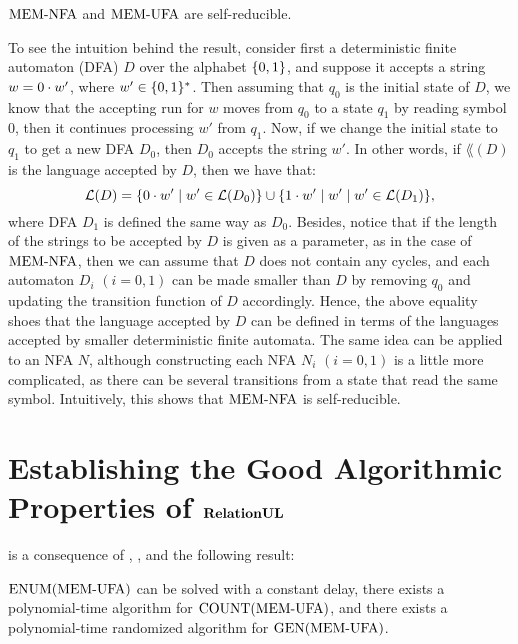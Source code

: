 \documentclass[11pt,twoside=off,numbers=noenddot]{scrbook}
\begin{document}
\begin{proposition}
    $\text{MEM-NFA}$ and $\text{MEM-UFA}$ are self-reducible.
\end{proposition}

\begin{proofidea}
    To see the intuition behind the result, consider first a deterministic finite automaton (DFA) $D$ over the alphabet $\{ 0, 1 \}$, and suppose it accepts a string $w = 0 \cdot w'$, where $w' \in \{ 0, 1 \}^\ast$. Then assuming that $q_0$ is the initial state of $D$, we know that the accepting run for $w$ moves from $q_0$ to a state $q_1$ by reading symbol $0$, then it continues processing $w'$ from $q_1$. Now, if we change the initial state to $q_1$ to get a new DFA $D_0$, then $D_0$ accepts the string $w'$. In other words, if $\lang(D)$ is the language accepted by $D$, then we have that:
    \[ \mathcal{L}(D) = \{ 0 \cdot w' \mid w' \in \mathcal{L}(D_0) \} \cup \{ 1 \cdot w' \mid w' \mid w' \in \mathcal{L}(D_1) \}, \]
    where DFA $D_1$ is defined the same way as $D_0$. Besides, notice that if the length of the strings to be accepted by $D$ is given as a parameter, as in the case of $\text{MEM-NFA}$, then we can assume that $D$ does not contain any cycles, and each automaton $D_i$ $(i = 0, 1)$ can be made smaller than $D$ by removing $q_0$ and updating the transition function of $D$ accordingly. Hence, the above equality shoes that the language accepted by $D$ can be defined in terms of the languages accepted by smaller deterministic finite automata. The same idea can be applied to an NFA $N$, although constructing each NFA $N_i$ $(i = 0, 1)$ is a little more complicated, as there can be several transitions from a state that read the same symbol. Intuitively, this shows that $\text{MEM-NFA}$ is self-reducible.
\end{proofidea}

\section{Establishing the Good Algorithmic Properties of $\textbf{RelationUL}$}
 is a consequence of , , and the following result:

\begin{proposition}
    $\text{ENUM}(\text{MEM-UFA})$ can be solved with a constant delay, there exists a polynomial-time algorithm for $\text{COUNT}(\text{MEM-UFA})$, and there exists a polynomial-time randomized algorithm for $\text{GEN}(\text{MEM-UFA})$.
\end{proposition}
\end{document}
